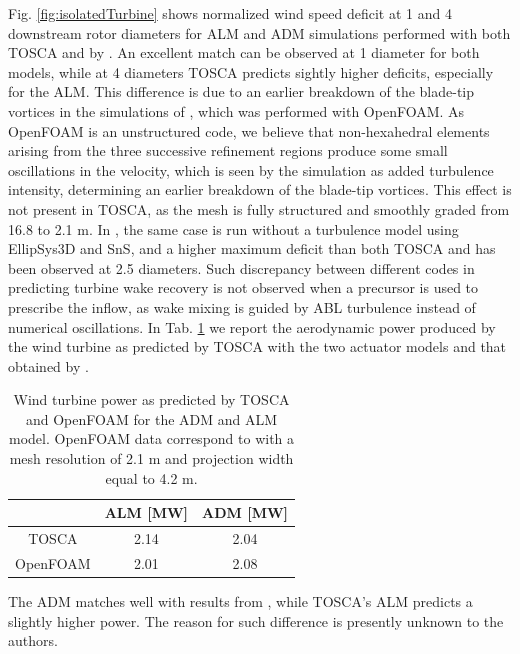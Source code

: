 \documentclass[journal abbreviation, manuscript]{copernicus}
\begin{document}
Fig. \ref{fig:isolatedTurbine} shows normalized wind speed deficit at 1 and 4 downstream rotor diameters for ALM and ADM simulations performed with both TOSCA and by \cite{2015_TossasLeonardi}. An excellent match can be observed at 1 diameter for both models, while at 4 diameters TOSCA predicts sightly higher deficits, especially for the ALM. This difference is due to an earlier breakdown of the blade-tip vortices in the simulations of \cite{2015_TossasLeonardi}, which was performed with OpenFOAM. As OpenFOAM is an unstructured code, we believe that non-hexahedral elements arising from the three successive refinement regions produce some small oscillations in the velocity, which is seen by the simulation as added turbulence intensity, determining an earlier breakdown of the blade-tip vortices. This effect is not present in TOSCA, as the mesh is fully structured and smoothly graded from 16.8 to 2.1 m. In \cite{2014_vanDerLaanEtAl}, the same case is run without a turbulence model using EllipSys3D and SnS, and a higher maximum deficit than both TOSCA and \cite{2015_TossasLeonardi} has been observed at 2.5 diameters. Such discrepancy between different codes in predicting turbine wake recovery is not observed when a precursor is used to prescribe the inflow, as wake mixing is guided by ABL turbulence instead of numerical oscillations. In Tab. \ref{tab:actuatorQuantitative} we report the aerodynamic power produced by the wind turbine as predicted by TOSCA with the two actuator models and that obtained by \cite{2015_TossasLeonardi}. 
\begin{table}[H]
	\begin{center}
		\begin{tabular}{c c c} 
			\hline
			  & ALM [MW] & ADM [MW]\\
			\hline
			TOSCA    & 2.14 & 2.04\\
            OpenFOAM & 2.01 & 2.08\\
			\hline
		\end{tabular}
	\end{center}
	\caption{Wind turbine power as predicted by TOSCA and OpenFOAM for the ADM and ALM model. OpenFOAM data correspond to \cite{2015_TossasLeonardi} with a mesh resolution of 2.1 m and projection width equal to 4.2 m.}
	\label{tab:actuatorQuantitative}
\end{table}
The ADM matches well with results from \cite{2015_TossasLeonardi}, while TOSCA's ALM predicts a slightly higher power. The reason for such difference is presently unknown to the authors. 
\end{document}
